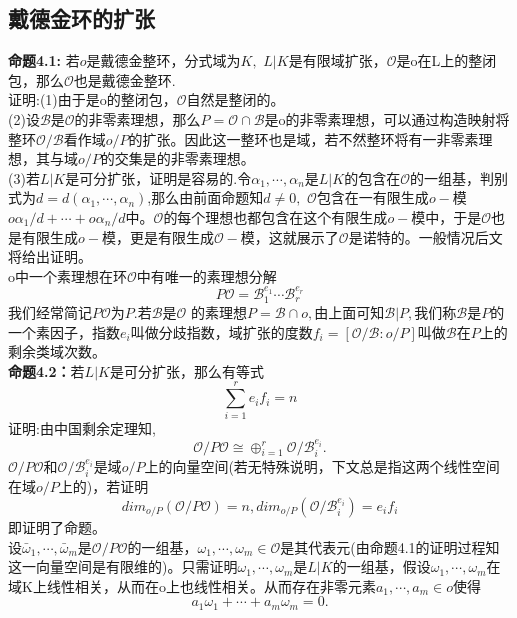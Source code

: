 \documentclass[UTF8]{article}
\begin{document}
    \subsection{戴德金环的扩张}
    \textbf{命题4.1:} 若$o$是戴德金整环，分式域为$K,$ $L|K$是有限域扩张，$\mathcal{O}$是o在L上的整闭包，那么$\mathcal{O}$也是戴德金整环.\\
    证明:(1)由于是o的整闭包，$\mathcal{O}$自然是整闭的。\\
      (2)设$\mathcal{B}$是$\mathcal{O}$的非零素理想，那么$P=\mathcal{O}\cap \mathcal{B}$是o的非零素理想，可以通过构造映射将整环$\mathcal{O}/\mathcal{B}$看作域$o/P$的扩张。因此这一整环也是域，若不然整环将有一非零素理想，其与域$o/P$的交集是的非零素理想。\\
      (3)若$L|K$是可分扩张，证明是容易的.令$\alpha_{1},\cdots ,\alpha_{n}$是$L|K$的包含在$\mathcal{O}$的一组基，判别式为$d=d(\alpha_{1},\cdots,\alpha_{n})$,那么由前面命题知$d\neq 0,$ $\mathcal{O}$包含在一有限生成$o-$模$o\alpha_{1}/d+\cdots+o\alpha_{n}/d$中。$\mathcal{O}$的每个理想也都包含在这个有限生成$o-$模中，于是$\mathcal{O}$也是有限生成$o-$模，更是有限生成$\mathcal{O}-$模，这就展示了$\mathcal{O}$是诺特的。一般情况后文将给出证明。\\
     o中一个素理想在环$\mathcal{O}$中有唯一的素理想分解
     $$
  P\mathcal{O}=\mathcal{B}_{1}^{e_{1}}\cdots  \mathcal{B}_{r}^{e_{r}} 
  $$
我们经常简记$P\mathcal{O}$为$P.$若$\mathcal{B}$是$\mathcal{O}$ 的素理想$P=\mathcal{B}\cap o,$由上面可知$\mathcal{B}|P,$我们称$\mathcal{B}$是$P$的一个素因子，指数$e_{i}$叫做分歧指数，域扩张的度数$f_{i}=[\mathcal{O}/\mathcal{B}:o/P]$叫做$\mathcal{B}$在$P$上的剩余类域次数。\\
\textbf{命题4.2：}若$L|K$是可分扩张，那么有等式
$$
\sum_{i=1}^{r}e_{i}f_{i}=n
$$
证明:由中国剩余定理知,
$$
\mathcal{O}/P\mathcal{O}\cong \oplus_{i=1}^{r}\mathcal{O}/\mathcal{B}_{i}^{e_{i}}.
$$
$\mathcal{O}/P\mathcal{O}$和$\mathcal{O}/\mathcal{B}_{i}^{e_{i}}$是域$o/P$上的向量空间(若无特殊说明，下文总是指这两个线性空间在域$o/P$上的)，若证明$$
dim_{o/P}(\mathcal{O}/P\mathcal{O})=n,dim_{o/P}(\mathcal{O}/\mathcal{B}_{i}^{e_{i}})=e_{i}f_{i}
$$即证明了命题。\\
设$\bar{\omega}_{1},\cdots ,\bar{\omega}_{m}$是$\mathcal{O}/P\mathcal{O}$的一组基，$\omega_{1},\cdots,\omega_{m}\in \mathcal{O}$是其代表元(由命题4.1的证明过程知这一向量空间是有限维的)。只需证明$\omega_{1},\cdots,\omega_{m}$是$L|K$的一组基，假设$\omega_{1},\cdots,\omega_{m}$在域K上线性相关，从而在o上也线性相关。从而存在非零元素$a_{1},\cdots,a_{m}\in o$使得$$
a_{1}\omega_{1}+\cdots+a_{m}\omega_{m}=0.
$$
\end{document}
